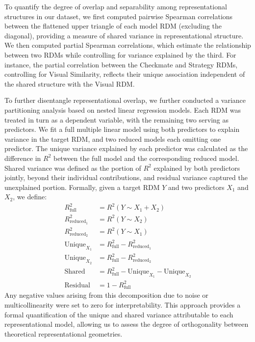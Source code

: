 
To quantify the degree of overlap and separability among representational structures in our dataset, we first computed pairwise Spearman correlations between the flattened upper triangle of each model RDM (excluding the diagonal), providing a measure of shared variance in representational structure. We then computed partial Spearman correlations, which estimate the relationship between two RDMs while controlling for variance explained by the third. For instance, the partial correlation between the Checkmate and Strategy RDMs, controlling for Visual Similarity, reflects their unique association independent of the shared structure with the Visual RDM. 

To further disentangle representational overlap, we further conducted a variance partitioning analysis based on nested linear regression models. Each RDM was treated in turn as a dependent variable, with the remaining two serving as predictors. We fit a full multiple linear model using both predictors to explain variance in the target RDM, and two reduced models each omitting one predictor. The unique variance explained by each predictor was calculated as the difference in $R^2$ between the full model and the corresponding reduced model. Shared variance was defined as the portion of $R^2$ explained by both predictors jointly, beyond their individual contributions, and residual variance captured the unexplained portion.
Formally, given a target RDM $Y$ and two predictors $X_1$ and $X_2$, we define:
\[
\begin{aligned}
R^2_{\text{full}} &= R^2(Y \sim X_1 + X_2) \\
R^2_{\text{reduced}_1} &= R^2(Y \sim X_2) \\
R^2_{\text{reduced}_2} &= R^2(Y \sim X_1) \\
\text{Unique}_{X_1} &= R^2_{\text{full}} - R^2_{\text{reduced}_1} \\
\text{Unique}_{X_2} &= R^2_{\text{full}} - R^2_{\text{reduced}_2} \\
\text{Shared} &= R^2_{\text{full}} - \text{Unique}_{X_1} - \text{Unique}_{X_2} \\
\text{Residual} &= 1 - R^2_{\text{full}}
\end{aligned}
\]
Any negative values arising from this decomposition due to noise or multicollinearity were set to zero for interpretability. This approach provides a formal quantification of the unique and shared variance attributable to each representational model, allowing us to assess the degree of orthogonality between theoretical representational geometries.


